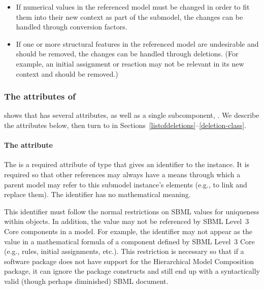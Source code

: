 \begin{itemize}

\item If numerical values in the referenced model must be changed in
  order to fit them into their new context as part of the submodel, the
  changes can be handled through conversion factors.

\item If one or more structural features in the referenced model are
  undesirable and should be removed, the changes can be handled through
  deletions.  (For example, an initial assignment or reaction may not be
  relevant in its new context and should be removed.)

\end{itemize}


\subsubsection{The attributes of }

 shows that \Submodel has several attributes, as well
as a single subcomponent, .  We describe the
attributes below, then turn to  in
Sections~\ref{listofdeletions}--\ref{deletion-class}.


\paragraph{The \fixttspace{} attribute}

The  is a required attribute of type  that gives
an identifier to the \Submodel instance.  It is required so that other
references may always have a means through which a parent model may
refer to this submodel instance's elements (e.g., to link and replace
them).  The identifier has no mathematical meaning.

This identifier must follow the normal restrictions on SBML
 values for uniqueness within \Model objects.  In
addition, the  value may not be referenced by SBML Level~3
Core components in a model.  For example, the identifier may not appear
as the  value in a mathematical formula of a component
defined by SBML Level~3 Core (e.g., rules, initial assignments, etc.).
This restriction is necessary so that if a software package does not
have support for the Hierarchical Model Composition package, it can
ignore the package constructs and still end up with a syntactically
valid (though perhaps diminished) SBML document.


